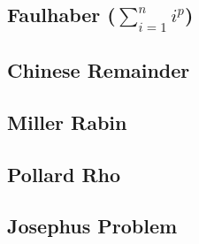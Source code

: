 \documentclass[a4paper,10pt,twocolumn,oneside]{article}
\begin{document}
%

% 

%

% 

\subsection{Faulhaber ($\sum\limits_{i=1}^{n}i^p$)}


\subsection{Chinese Remainder}


\subsection{Miller Rabin}


\subsection{Pollard Rho}


\subsection{Josephus Problem}


%
\end{document}

